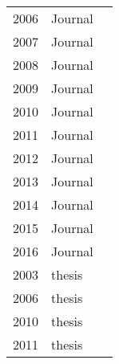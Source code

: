 \begin{table}[]
\begin{tabular}{lll}
2006 & Journal & \cite{Garousi2006}\cite{Ag2006} \\
2007 & Journal & \cite{Cai2007}\cite{Nevedrov2007} \\
2008 & Journal & \cite{Bayan2008}\cite{Afzal2008}\cite{Bertolino2008} \\
2009 & Journal & \cite{Acharya2009}\cite{Jiang2009a}\cite{Afzal2009a}\cite{Hierons2009} \\
2010 & Journal & \cite{Wang2010}\cite{Malik2010b} \cite{Garousi2010} \\
2011 & Journal & \cite{Babbar2011}\cite{Barna2013}\cite{Nguyen2011}\cite{Shoaib2011}\cite{Zhang2011}\cite{Santos2011}\cite{Catelani2011} \\
2012 & Journal & \cite{Yan2012}\cite{Grechanik2012} \cite{Vasar2012} \\
2013 & Journal & \cite{Malik2013a}\cite{Wang2013}\cite{Wert2013a} \\
2014 & Journal & \cite{Wert2014}\cite{Wang2010} \\
2015 & Journal & \cite{Jiang2015}\cite{Luo2015}\cite{Harman2015} \\
2016 & Journal & \cite{Vogele2016} \\
2003 & thesis & \cite{Shousha2003} \\
2006 & thesis & \cite{Garousi2006} \\
2010 & thesis & \cite{Jiang2010} \\
2011 & thesis & \cite{Vetoio2011}
\end{tabular}
\end{table}



